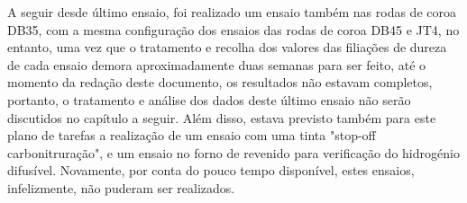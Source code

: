 \newpage
\par
A seguir desde último ensaio, foi realizado um ensaio também nas rodas de coroa DB35, com a mesma configuração dos ensaios das rodas de coroa DB45 e JT4, no entanto, uma vez que o tratamento e recolha dos valores das filiações de dureza de cada ensaio demora aproximadamente duas semanas para ser feito, até o momento da redação deste documento, os resultados não estavam completos, portanto, o tratamento e análise dos dados deste último ensaio não serão discutidos no capítulo a seguir. Além disso, estava previsto também para este plano de tarefas a realização de um ensaio com uma tinta "stop-off carbonitruração", e um ensaio no forno de revenido para verificação do hidrogénio difusível. Novamente, por conta do pouco tempo disponível, estes ensaios, infelizmente, não puderam ser realizados.